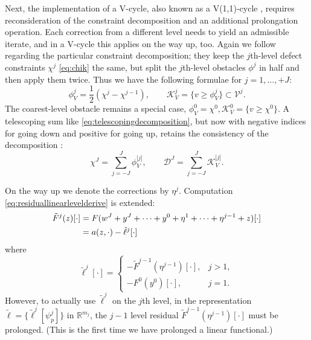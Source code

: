 \documentclass[letterpaper,final,12pt,reqno]{amsart}
\theoremstyle{claim}
\newcommand{\RR}{\mathbb{R}}
\numberwithin{equation}{section}
\numberwithin{figure}{section}
\numberwithin{table}{section}
\numberwithin{theorem}{section}
\begin{document}
Next, the implementation of a V-cycle, also known as a V(1,1)-cycle \cite{GraeserKornhuber2009}, requires reconsideration of the constraint decomposition and an additional prolongation operation.  Each correction from a different level needs to yield an admissible iterate, and in a V-cycle this applies on the way up, too.  Again we follow \cite{GraeserKornhuber2009} regarding the particular constraint decomposition; they keep the $j$th-level defect constraints $\chi^j$ \eqref{eq:chik} the same, but split the $j$th-level obstacles $\phi^j$ in half and then apply them twice.  Thus we have the following formulae for $j=1,\dots,+J$:
\begin{equation}
\phi_V^j = \frac{1}{2}(\chi^j-\chi^{j-1}), \qquad \mathcal{K}_V^j = \{v \ge \phi_V^j\} \subset \mathcal{V}^j.
\end{equation}
The coarest-level obstacle remains a special case, $\phi_V^0 = \chi^0,\mathcal{K}_V^0 = \{v \ge \chi^0\}$.  A telescoping sum like \eqref{eq:telescopingdecomposition}, but now with negative indices for going down and positive for going up, retains the consistency of the decomposition \cite{GraeserKornhuber2009,Tai2003}:
\begin{equation}
\chi^J = \sum_{j=-J}^J \phi_V^{|j|}, \qquad \mathcal{D}^J = \sum_{j=-J}^J \mathcal{K}_V^{|j|}.
\end{equation}

On the way up we denote the corrections by $\eta^j$.  Computation \eqref{eq:residuallinearlevelderive} is extended:
\begin{align}
  \tilde F^j(z)[\cdot] &= F(w^J + y^J + \dots + y^0 + \eta^1 + \dots + \eta^{j-1} + z)[\cdot]  \label{eq:residuallinearlevelv} \\
     &= a(z,\cdot) - \tilde \ell^j[\cdot] \notag
\end{align}
where
\begin{equation}
  \tilde\ell^j[\cdot] = \begin{cases} - \tilde F^{j-1}(\eta^{j-1})[\cdot], & j > 1, \\
                                      - F^0(y^0)[\cdot], & j = 1. \end{cases} \label{eq:rhslinearlevelv}
\end{equation}
However, to actually use $\tilde\ell^j$ on the $j$th level, in the representation $\tilde{\bm{\ell}} = \{\tilde\ell^j[\psi_p^j]\}$ in $\RR^{m_j}$, the $j-1$ level residual $\tilde F^{j-1}(\eta^{j-1})[\cdot]$ must be prolonged.  (This is the first time we have prolonged a linear functional.)
\end{document}
